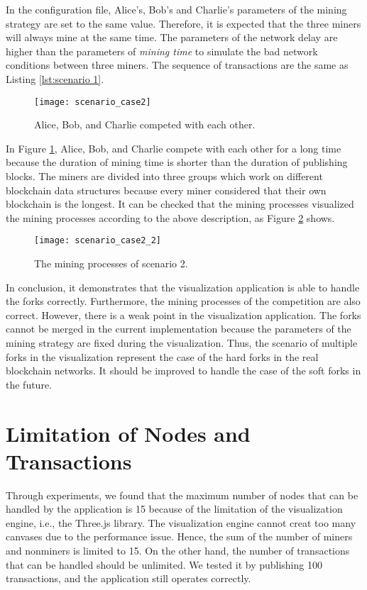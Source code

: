 In the configuration file, Alice's, Bob's and Charlie's parameters of the mining strategy are set to the same value. Therefore, it is expected that the three miners will always mine at the same time. The parameters of the network delay are higher than the parameters of \textit{mining time} to simulate the bad network conditions between three miners. The sequence of transactions are the same as Listing \ref{lst:scenario 1}.

\begin{figure}[htb]
    \centering
    \texttt{[image: scenario\_case2]}
    \caption{Alice, Bob, and Charlie competed with each other.}
    \label{fig:alice, bob, and charlie competed with each other}
\end{figure}

In Figure \ref{fig:alice, bob, and charlie competed with each other}, Alice, Bob, and Charlie compete with each other for a long time because the duration of mining time is shorter than the duration of publishing blocks. The miners are divided into three groups which work on different blockchain data structures because every miner considered that their own blockchain is the longest. It can be checked that the mining processes visualized the mining processes according to the above description, as Figure \ref{fig:the mining processes of scenario 2} shows.

\begin{figure}[htb]
    \centering
    \texttt{[image: scenario\_case2\_2]}
    \caption{The mining processes of scenario 2.}
    \label{fig:the mining processes of scenario 2}
\end{figure}

In conclusion, it demonstrates that the visualization application is able to handle the forks correctly. Furthermore, the mining processes of the competition are also correct. However, there is a weak point in the visualization application. The forks cannot be merged in the current implementation because the parameters of the mining strategy are fixed during the visualization. Thus, the scenario of multiple forks in the visualization represent the case of the hard forks in the real blockchain networks. It should be improved to handle the case of the soft forks in the future.

\section{Limitation of Nodes and Transactions}

Through experiments, we found that the maximum number of nodes that can be handled by the application is 15 because of the limitation of the visualization engine, i.e., the Three.js library. The visualization engine cannot creat too many canvases due to the performance issue. Hence, the sum of the number of miners and nonminers is limited to 15. On the other hand, the number of transactions that can be handled should be unlimited. We tested it by publishing 100 transactions, and the application still operates correctly.

